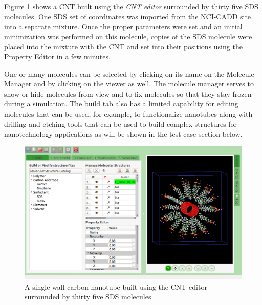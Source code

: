 \documentclass{article}
\begin{document}
Figure \ref{fig:mainWindow} shows a CNT built using the \textit{CNT editor} surrounded by thirty five SDS molecules.  One SDS set of 
coordinates was imported from the NCI-CADD site into a separate mixture. Once the proper parameters were set and an initial minimization was performed on this molecule, copies of the SDS molecule were placed into the mixture with the CNT and set into their positions using the Property Editor in a few minutes.

One or many molecules can be selected by clicking on its name on the Molecule Manager and by clicking on the viewer as well.  The molecule manager serves to show or hide molecules from view and to fix molecules so that they stay frozen during a simulation.   
The build tab also has a limited capability for editing molecules that can be used, for example, to functionalize nanotubes  along with drilling and etching tools that can be used to build complex structures for nanotechnology applications as will be shown in the test case section below.

\begin{figure}
\begin{center}
  \includegraphics[scale=0.40]{mainWindow.png} 
  \caption{A single wall carbon nanotube built using the CNT editor surrounded by thirty five SDS molecules}
  \label{fig:mainWindow}

\end{center}\end{figure}
\end{document}
